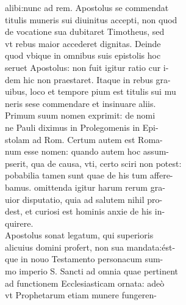 \documentclass{article}
\begin{document}
\begin{pages}
                alibi:nunc ad rem. Apostolus se commendat \\
                titulis muneris sui diuinitus accepti, non quod \\
                de vocatione sua dubitaret Timotheus, sed \\
                vt rebus maior accederet dignitas. Deinde \\
                quod vbique in omnibus suis epistolis hoc \\
                seruet Apostolus: non fuit igitur ratio cur i- \\
                dem hic non praestaret. Itaque in rebus gra- \\
                uibus, loco et tempore pium est titulis sui mu \\
                neris sese commendare et insinuare aliis. \\
                Primum suum nomen exprimit: de nomi \\
                ne Pauli diximus in Prolegomenis in Epi- \\
                stolam ad Rom. Certum autem est Roma- \\
                num esse nomen: quando autem hoc assum- \\
                pserit, qua de causa, vti, certo sciri non potest: \\
                pobabilia tamen sunt quae de his tum affere- \\
                bamus. omittenda igitur harum rerum gra- \\
                uior disputatio, quia ad salutem nihil pro- \\
                dest, et curiosi est hominis anxie de his in- \\
                quirere. \\
                Apostolus sonat legatum, qui superioris \\
                alicuius domini profert, non sua mandata:ést- \\
                que in nouo Testamento personacum sum- \\
                mo imperio S. Sancti ad omnia quae pertinent \\
                ad functionem Ecclesiasticam ornata: adeò \\
                vt Prophetarum etiam munere fungeren- \\

\end{pages}
\end{document}
